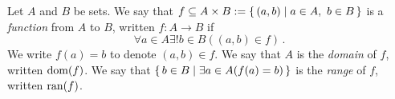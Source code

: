 \guard


\begin{defn}
\label{defn:function}
  Let $A$ and $B$ be sets.
  We say that $f\subseteq A\times B :=\left\{\,(a,b)\mid a\in A,~b\in B\,\right\}$ is a \emph{function} from $A$ to $B$, written $f:A\to B$ if \[ \forall a\in A\exists!b\in B( (a,b)\in f)\,.\]
  We write $f(a)=b$ to denote $(a,b)\in f$.
  We say that $A$ is the \emph{domain} of $f$, written $\mathrm{dom}(f)$.
  We say that $\left\{\,b\in B\mid \exists a\in A(f(a)=b)\,\right\}$ is the \emph{range} of $f$, written $\mathrm{ran}(f)$.
\end{defn}
